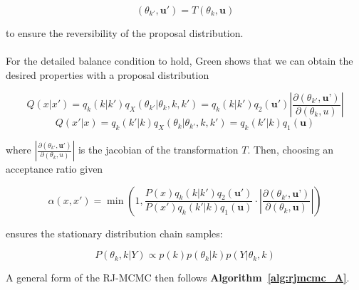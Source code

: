 \begin{equation}
\label{eq:T}
(\theta_{k'}, \mathbf{u'}) = T(\theta_k, \mathbf{u}) 
\end{equation}

to ensure the reversibility of the proposal distribution. 

\paragraph{}For the detailed balance condition to hold, Green\cite{Green1995-kh} shows that we can obtain the desired properties with a proposal distribution

$$Q(x | x') = q_k(k|k') q_X(\theta_{k'} | \theta_k, k, k') = q_k(k|k')q_2(\textbf{u}')\left|\frac{\partial(\theta_{k'}, \textbf{u'})}{\partial(\theta_k, u)} \right|$$ 
$$Q(x' | x) = q_k(k'|k) q_X(\theta_k | \theta_{k'}, k, k') = q_k(k'|k)q_1(\textbf{u})$$ 

where $\left|\frac{\partial(\theta_{k'}, \textbf{u}')}{\partial(\theta_k, u)} \right|$ is the jacobian of the transformation $T$. Then, choosing an acceptance ratio given 
 
 \begin{equation}
 \label{eq:alpharj}
  \alpha\left(x, x'\right) = \min\left(1, \frac{P(x)q_k(k | k')q_2(\textbf{u}') }{P(x')q_k(k' | k)q_1(\textbf{u}) }\cdot\left|\frac{\partial(\theta_{k'}, \textbf{u'})}{\partial(\theta_k, \mathbf{u})} \right|\right)
 \end{equation}


ensures the stationary distribution chain samples:

\begin{equation}
P(\theta_k, k | Y) \propto p(k)p(\theta_k|k)p(Y | \theta_k, k)
\end{equation}

A general form of the RJ-MCMC then follows \textbf{Algorithm~\ref{alg:rjmcmc_A}}.

